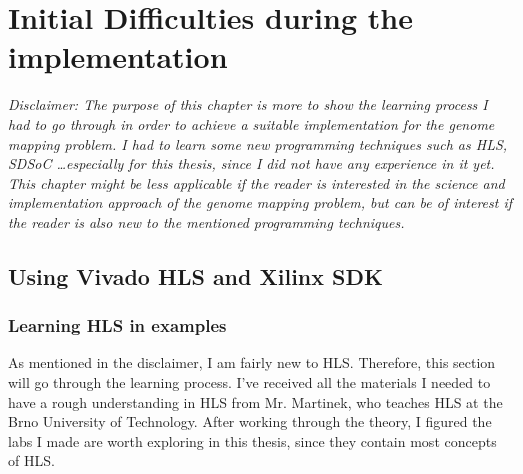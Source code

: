 
\chapter{Initial Difficulties during the implementation}

\textit{Disclaimer: The purpose of this chapter is more to show the learning process I had to go through in order to achieve a suitable implementation for the genome mapping problem. I had to learn some new programming techniques such as HLS, SDSoC \dots especially for this thesis, since I did not have any experience in it yet. This chapter might be less applicable if the reader is interested in the science and implementation approach of the genome mapping problem, but can be of interest if the reader is also new to the mentioned programming techniques.}

\section{Using Vivado HLS and Xilinx SDK}

\subsection{Learning HLS in examples}
\label{HLS}

As mentioned in the disclaimer, I am fairly new to HLS. Therefore, this section will go through the learning process. I've received all the materials I needed to have a rough understanding in HLS from Mr. Martinek, who teaches HLS at the Brno University of Technology. After working through the theory, I figured the labs I made are worth exploring in this thesis, since they contain most concepts of HLS.

